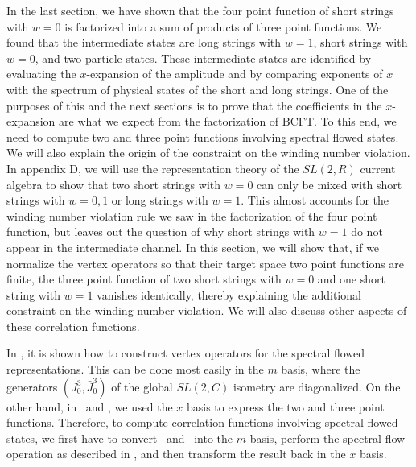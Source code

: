 

In the last section, we have shown that the four point function of
short strings with $w=0$ is factorized
into a sum of products of three point functions. We found that
the intermediate states
are long strings with $w=1$, short strings with $w=0$,
and two particle states. These intermediate states are
identified by evaluating the $x$-expansion of the amplitude
and by comparing exponents of $x$ with the  spectrum of physical
states of the short and long strings. One of the
purposes of this and the next sections
is to prove that the coefficients
in the $x$-expansion are what we expect from the factorization
of BCFT.  To this end, we need to compute two and three point
functions involving spectral flowed states.
We  will also
explain the origin of the constraint on the winding number
violation. In appendix D, we will use the representation theory
of the $SL(2,R)$ current algebra to show that two short strings
with $w=0$ can only be mixed with short strings with
$w=0, 1$ or long strings with $w=1$. This almost accounts
for the winding number violation rule we saw in the factorization
of the four point function, but leaves out the question of
why short strings with $w=1$ do not appear in the intermediate
channel. In this section,
we will show that, if we normalize the vertex operators so
that their target space two point functions are finite,
the three point function of two short
strings with $w=0$ and one short string with $w=1$ vanishes
identically, thereby explaining the additional constraint on
the winding number violation. We will also discuss  other
aspects of these correlation functions.

In \first, it is shown how to construct vertex operators for
the spectral flowed representations. This can be done most
easily in the $m$ basis, where the generators $(J_0^3, \bar{J}_0^3)$
of the global $SL(2,C)$ isometry are diagonalized. On the
other hand, in \teschnertwo\ and \teschnerthree,
we used the $x$ basis to express
the two and three point functions.
Therefore, to compute correlation functions involving
spectral flowed states, we first have to convert \teschnertwo\
and \teschnerthree\ into the $m$ basis, perform the spectral
flow operation as described in \first, and then transform the
result back in the $x$ basis.

